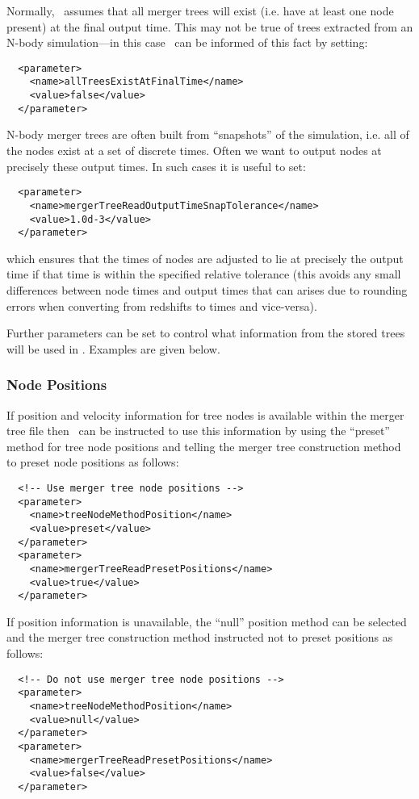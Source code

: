 Normally, \glc\ assumes that all merger trees will exist (i.e. have at least one node present) at the final output time. This may not be true of trees extracted from an N-body simulation---in this case \glc\ can be informed of this fact by setting:
\begin{verbatim}
  <parameter>
    <name>allTreesExistAtFinalTime</name>
    <value>false</value>
  </parameter>
\end{verbatim}

N-body merger trees are often built from ``snapshots'' of the simulation, i.e. all of the nodes exist at a set of discrete times. Often we want to output nodes at precisely these output times. In such cases it is useful to set:
\begin{verbatim}
  <parameter>
    <name>mergerTreeReadOutputTimeSnapTolerance</name>
    <value>1.0d-3</value>
  </parameter>
\end{verbatim}
which ensures that the times of nodes are adjusted to lie at precisely the output time if that time is within the specified relative tolerance (this avoids any small differences between node times and output times that can arises due to rounding errors when converting from redshifts to times and vice-versa).

Further parameters can be set to control what information from the stored trees will be used in \glc. Examples are given below.

\subsubsection{Node Positions}

If position and velocity information for tree nodes is available within the merger tree file then \glc\ can be instructed to use this information by using the ``preset'' method for tree node positions and telling the merger tree construction method to preset node positions as follows:
\begin{verbatim}
  <!-- Use merger tree node positions -->
  <parameter>
    <name>treeNodeMethodPosition</name>
    <value>preset</value>
  </parameter>
  <parameter>
    <name>mergerTreeReadPresetPositions</name>
    <value>true</value>
  </parameter>
\end{verbatim}
If position information is unavailable, the ``null'' position method can be selected and the merger tree construction method instructed not to preset positions as follows:
\begin{verbatim}
  <!-- Do not use merger tree node positions -->
  <parameter>
    <name>treeNodeMethodPosition</name>
    <value>null</value>
  </parameter>
  <parameter>
    <name>mergerTreeReadPresetPositions</name>
    <value>false</value>
  </parameter>
\end{verbatim}

